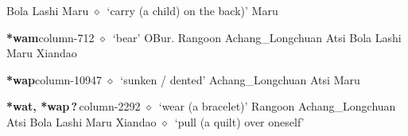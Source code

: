 \hspace{1ex}
         Bola 
\hspace{1ex}
         Lashi 
\hspace{1ex}
         Maru 
\hspace{1ex}
         $\diamond$~`carry (a child) on the back)'
         Maru 
  \item {\footnotesize \textbf{*wam}}{\tiny column-712}
         $\diamond$~`bear'
         OBur. 
\hspace{1ex}
         Rangoon 
\hspace{1ex}
         Achang\_Longchuan 
\hspace{1ex}
         Atsi 
\hspace{1ex}
         Bola 
\hspace{1ex}
         Lashi 
\hspace{1ex}
         Maru 
\hspace{1ex}
         Xiandao 
  \item {\footnotesize \textbf{*wap}}{\tiny column-10947}
         $\diamond$~`sunken / dented'
         Achang\_Longchuan 
\hspace{1ex}
         Atsi 
\hspace{1ex}
         Maru 
  \item {\footnotesize \textbf{*wat, *wap\,?\,}}{\tiny column-2292}
         $\diamond$~`wear (a bracelet)'
         Rangoon 
\hspace{1ex}
         Achang\_Longchuan 
\hspace{1ex}
         Atsi 
\hspace{1ex}
         Bola 
\hspace{1ex}
         Lashi 
\hspace{1ex}
         Maru 
\hspace{1ex}
         Xiandao 
\hspace{1ex}
         $\diamond$~`pull (a quilt) over oneself'
